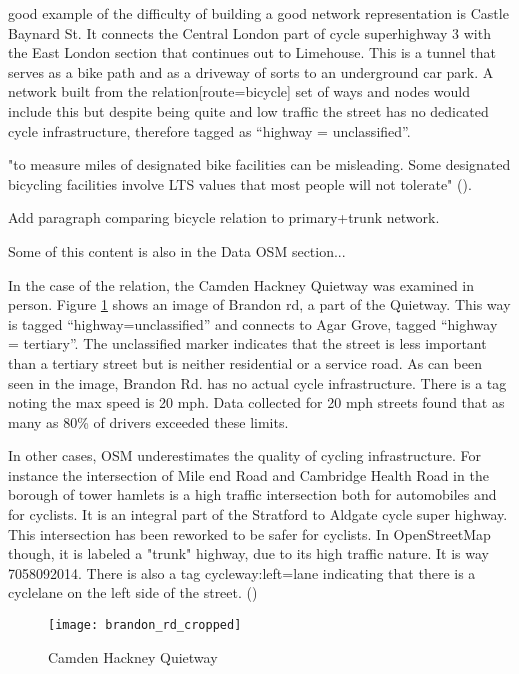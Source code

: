 good example of the difficulty of building a good network representation is Castle Baynard St. It connects the Central London part of cycle superhighway 3 with the East London section that continues out to Limehouse. This is a tunnel that serves as a bike path and as a driveway of sorts to an underground car park. A network built from the relation[route=bicycle] set of ways and nodes would include this but despite being quite and low traffic the street has no dedicated cycle infrastructure, therefore tagged as ``highway = unclassified''. 

"to measure miles of designated bike facilities can be misleading. Some designated bicycling facilities involve LTS values that most people will not tolerate" (\cite{furth2016network}).

Add paragraph comparing bicycle relation to primary+trunk network. 

Some of this content is also in the Data OSM section...

In the case of the relation, the Camden Hackney Quietway was examined in person. Figure \ref{fig:brandon} shows an image of Brandon rd, a part of the Quietway. This way is tagged ``highway=unclassified'' and connects to Agar Grove, tagged ``highway = tertiary''. The unclassified marker indicates that the street is less important than a tertiary street but is neither residential or a service road. As can been seen in the image, Brandon Rd. has no actual cycle infrastructure. There is a tag noting the max speed is 20 mph. Data collected for 20 mph streets found that as many as 80\% of drivers exceeded these limits. 

In other cases, OSM underestimates the quality of cycling infrastructure. For instance the intersection of Mile end Road and Cambridge Health Road in the borough of tower hamlets is a high traffic intersection both for automobiles and for cyclists. It is an integral part of the Stratford to Aldgate cycle super highway. This intersection has been reworked to be safer for cyclists. In OpenStreetMap though, it is labeled a "trunk" highway, due to its high traffic nature. It is way 7058092014. There is also a tag cycleway:left=lane indicating that there is a cyclelane on the left side of the street. (\cite{osm})


\begin{figure}
\centering
\texttt{[image: brandon\_rd\_cropped]}
\caption{Camden Hackney Quietway}
\label{fig:brandon}
\end{figure}


